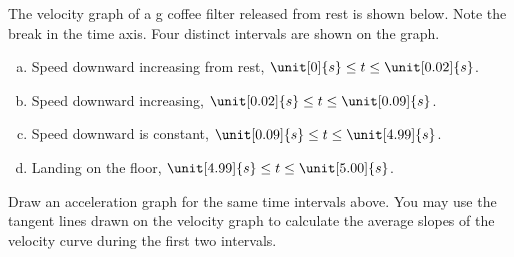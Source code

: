 \label{fnt8.2.1-5}

The velocity graph of a \unit[1]{g} coffee filter released from rest is shown below. Note the break in the time axis. Four distinct intervals are shown on the graph.
\begin{enumerate}[(a)]
	\item Speed downward increasing from rest, $\unit[0]{s} \leq t \leq \unit[0.02]{s}$.
	\item Speed downward increasing, $\unit[0.02]{s} \leq t \leq \unit[0.09]{s}$.
	\item Speed downward is constant, $\unit[0.09]{s} \leq t \leq \unit[4.99]{s}$.
	\item Landing on the floor, $\unit[4.99]{s} \leq t \leq \unit[5.00]{s}$.
\end{enumerate}
Draw an acceleration graph for the same time intervals above. You may use the tangent lines drawn on the velocity graph to calculate the average slopes of the velocity curve during the first two intervals.